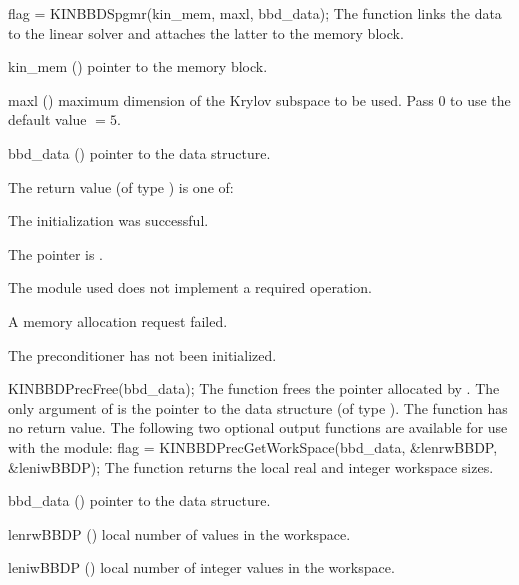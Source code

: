 {
  flag = KINBBDSpgmr(kin\_mem, maxl, bbd\_data);
}
{
  The function  links the {\kinbbdpre} data to the
  {\kinspgmr} linear solver and attaches the latter to the {\kinsol}
  memory block.
}
{
  \begin{args}
  \item[kin\_mem] ()
    pointer to the {\kinsol} memory block.
  \item[maxl] ()
    maximum dimension of the Krylov subspace to be used. Pass $0$ to use the 
    default value $=5$.
  \item[bbd\_data] ()
    pointer to the {\kinbbdpre} data structure.
  \end{args}
}
{
  The return value  (of type ) is one of:
  \begin{args}
  \item[\Id{KINSPGMR\_SUCCESS}] 
    The {\kinspgmr} initialization was successful.
  \item[\Id{KINSPGMR\_MEM\_NULL}]
    The  pointer is .
  \item[\Id{KINSPGMR\_ILL\_INPUT}]
    The {\nvector} module used does not implement a required operation.
  \item[\Id{KINSPGMR\_MEM\_FAIL}]
    A memory allocation request failed.
  \item[\Id{KIN\_PDATA\_NULL}]
    The {\kinbbdpre} preconditioner has not been initialized.
  \end{args}
}
{}
{
  KINBBDPrecFree(bbd\_data);
}
{
  The function  frees the pointer allocated by
  .
}
{
  The only argument of  is the pointer to the {\kinbbdpre} 
  data structure (of type ).
}
{
  The function  has no return value.
}
{}
The following two optional output functions are available for use with
the {\kinbbdpre} module:
{
  flag = KINBBDPrecGetWorkSpace(bbd\_data, \&lenrwBBDP, \&leniwBBDP);
}
{
  The function  returns the local
  {\kinbbdpre} real and integer workspace sizes.
}
{
  \begin{args}[lenrwBBDP]
  \item[bbd\_data] ()
    pointer to the {\kinbbdpre} data structure.
  \item[lenrwBBDP] ()
    local number of  values in the {\kinbbdpre} workspace.
  \item[leniwBBDP] ()
    local number of integer values in the {\kinbbdpre} workspace.
  \end{args}
}

